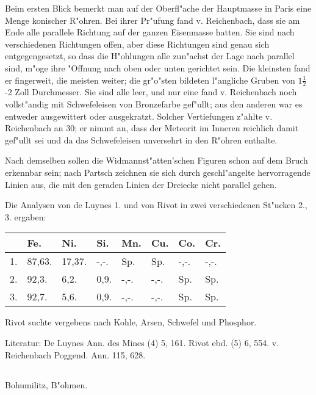 \documentclass[a4paper, 11pt, oneside]{article}
\begin{document}
Beim ersten Blick bemerkt man auf der Oberfl"ache der Hauptmasse in Paris eine Menge konischer R"ohren. Bei ihrer Pr"ufung fand v. Reichenbach, dass sie am Ende alle parallele Richtung auf der ganzen Eisenmasse hatten. Sie sind nach verschiedenen Richtungen offen, aber diese Richtungen sind genau sich entgegengesetzt, so dass die H"ohlungen alle zun"achst der Lage nach parallel sind, m"oge ihre "Offnung nach oben oder unten gerichtet sein. Die kleinsten fand er fingerweit, die meisten weiter; die gr"o"sten bildeten l"angliche Gruben von $\mathfrak{1\frac{1}{2}}$-2 Zoll Durchmesser. Sie sind alle leer, und nur eine fand v. Reichenbach noch vollst"andig mit Schwefeleisen von Bronzefarbe gef"ullt; aus den anderen war es entweder ausgewittert oder ausgekratzt. Solcher Vertiefungen z"ahlte v. Reichenbach an 30; er nimmt an, dass der Meteorit im Inneren reichlich damit gef"ullt sei und da das Schwefeleisen unversehrt in den R"ohren enthalte.

Nach demselben sollen die Widmannst"atten'schen Figuren schon auf dem Bruch erkennbar sein; nach Partsch zeichnen sie sich durch geschl"angelte hervorragende Linien aus, die mit den geraden Linien der Dreiecke nicht parallel gehen.

Die Analysen von de Luynes 1. und von Rivot in zwei verschiedenen St"ucken 2., 3. ergaben:
\begin{table}[H]
    \centering\swabfamily\Large
    \begin{tabular}{l l l l l l l l}
         & Fe. & Ni. & Si. & Mn. & Cu. & Co. & Cr. \\ \hline
        1. & 87,63. & 17,37. & -,-. & Sp. & Sp. & -,-. & -,-. \\
        2. & 92,3. & 6,2. & 0,9. & -,-. & -,-. & Sp. & Sp. \\
        3. & 92,7. & 5,6. & 0,9. & -,-. & -,-. & Sp. & Sp. \\
    \end{tabular}
\end{table}

Rivot suchte vergebens nach Kohle, Arsen, Schwefel und Phosphor.

\normalsize
Literatur: De Luynes Ann. des Mines (4) 5, 161. Rivot ebd. (5) 6, 554. v. Reichenbach Poggend. Ann. 115, 628.

\subsection{}
\LARGE
\paragraph{}
Bohumilitz, B"ohmen.
\end{document}
